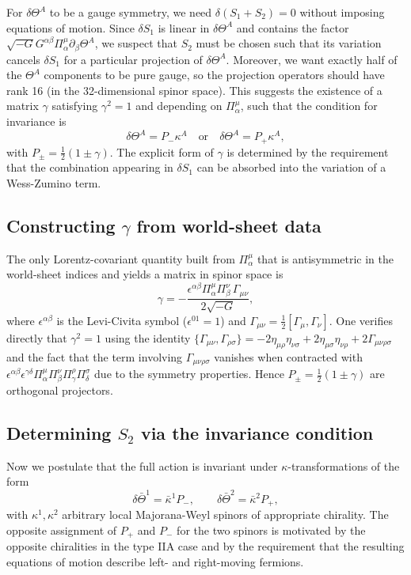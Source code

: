 \documentclass[12pt]{article}
\newcommand{\cbar}{\bar{\kappa}}
\begin{document}
For $\delta\Theta^A$ to be a gauge symmetry, we need $\delta(S_1+S_2)=0$ without imposing equations of motion. Since $\delta S_1$ is linear in $\delta\Theta^A$ and contains the factor $\sqrt{-G}G^{\alpha\beta}\Pi^\mu_\alpha\partial_\beta\Theta^A$, we suspect that $S_2$ must be chosen such that its variation cancels $\delta S_1$ for a particular projection of $\delta\Theta^A$. Moreover, we want exactly half of the $\Theta^A$ components to be pure gauge, so the projection operators should have rank 16 (in the 32-dimensional spinor space). This suggests the existence of a matrix $\gamma$ satisfying $\gamma^2=1$ and depending on $\Pi^\mu_\alpha$, such that the condition for invariance is
\[
\delta\Theta^A = P_- \kappa^A \quad\text{or}\quad \delta\Theta^A = P_+ \kappa^A,
\]
with $P_\pm = \tfrac12(1\pm\gamma)$. The explicit form of $\gamma$ is determined by the requirement that the combination appearing in $\delta S_1$ can be absorbed into the variation of a Wess-Zumino term.

\subsection{Constructing $\gamma$ from world-sheet data}

The only Lorentz-covariant quantity built from $\Pi^\mu_\alpha$ that is antisymmetric in the world-sheet indices and yields a matrix in spinor space is
\[
\gamma = -\frac{\epsilon^{\alpha\beta}\Pi^\mu_\alpha\Pi^\nu_\beta\,\Gamma_{\mu\nu}}{2\sqrt{-G}},
\]
where $\epsilon^{\alpha\beta}$ is the Levi-Civita symbol ($\epsilon^{01}=1$) and $\Gamma_{\mu\nu}=\frac12[\Gamma_\mu,\Gamma_\nu]$. One verifies directly that $\gamma^2=1$ using the identity $\{\Gamma_{\mu\nu},\Gamma_{\rho\sigma}\} = -2\eta_{\mu\rho}\eta_{\nu\sigma}+2\eta_{\mu\sigma}\eta_{\nu\rho}+2\Gamma_{\mu\nu\rho\sigma}$ and the fact that the term involving $\Gamma_{\mu\nu\rho\sigma}$ vanishes when contracted with $\epsilon^{\alpha\beta}\epsilon^{\gamma\delta}\Pi_\alpha^\mu\Pi_\beta^\nu\Pi_\gamma^\rho\Pi_\delta^\sigma$ due to the symmetry properties. Hence $P_\pm = \frac12(1\pm\gamma)$ are orthogonal projectors.

\subsection{Determining $S_2$ via the invariance condition}

Now we postulate that the full action is invariant under $\kappa$-transformations of the form
\begin{equation}
\delta\bar{\Theta}^1 = \cbar^1 P_-,\qquad \delta\bar{\Theta}^2 = \cbar^2 P_+, \label{kappa:choice}
\end{equation}
with $\kappa^1,\kappa^2$ arbitrary local Majorana-Weyl spinors of appropriate chirality. The opposite assignment of $P_+$ and $P_-$ for the two spinors is motivated by the opposite chiralities in the type IIA case and by the requirement that the resulting equations of motion describe left- and right-moving fermions.
\end{document}
